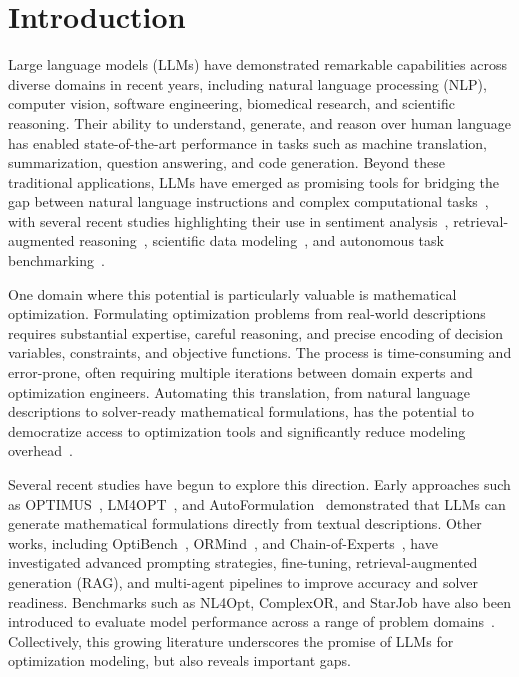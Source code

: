 \documentclass[review,12pt]{elsarticle}
\begin{document}

\section{Introduction}
Large language models (LLMs) have demonstrated remarkable capabilities across diverse domains in recent years, including natural language processing (NLP), computer vision, software engineering, biomedical research, and scientific reasoning. Their ability to understand, generate, and reason over human language has enabled state-of-the-art performance in tasks such as machine translation, summarization, question answering, and code generation. Beyond these traditional applications, LLMs have emerged as promising tools for bridging the gap between natural language instructions and complex computational tasks~\cite{LLMSSurvey}, with several recent studies highlighting their use in sentiment analysis~\cite{Neuro1,Neuro3}, retrieval-augmented reasoning~\cite{Neuro2}, scientific data modeling~\cite{Neuro4}, and autonomous task benchmarking~\cite{Neuro5}.

One domain where this potential is particularly valuable is mathematical optimization. Formulating optimization problems from real-world descriptions requires substantial expertise, careful reasoning, and precise encoding of decision variables, constraints, and objective functions. The process is time-consuming and error-prone, often requiring multiple iterations between domain experts and optimization engineers. Automating this translation, from natural language descriptions to solver-ready mathematical formulations, has the potential to democratize access to optimization tools and significantly reduce modeling overhead~\cite{li2023synthesizing,ahmed2024lm4opt,huang2024optibench,abdelrahman2025teaching}.

Several recent studies have begun to explore this direction. Early approaches such as OPTIMUS~\cite{ahmaditeshnizi2024optimus}, LM4OPT~\cite{4}, and AutoFormulation~\cite{astorga2024autoformulation} demonstrated that LLMs can generate mathematical formulations directly from textual descriptions. Other works, including OptiBench~\cite{2}, ORMind~\cite{wang2025ormind}, and Chain-of-Experts~\cite{3}, have investigated advanced prompting strategies, fine-tuning, retrieval-augmented generation (RAG), and multi-agent pipelines to improve accuracy and solver readiness. Benchmarks such as NL4Opt, ComplexOR, and StarJob have also been introduced to evaluate model performance across a range of problem domains~\cite{1,2,9}. Collectively, this growing literature underscores the promise of LLMs for optimization modeling, but also reveals important gaps.
\end{document}
